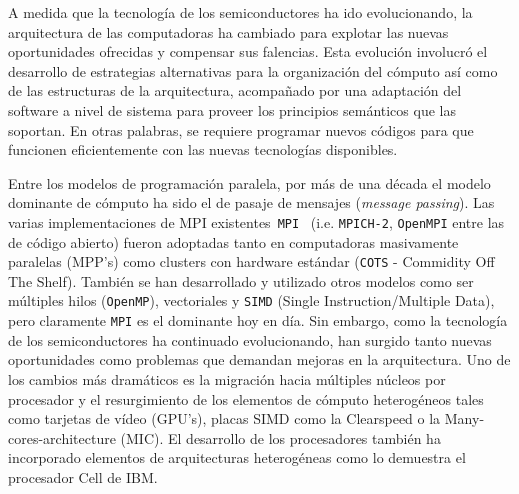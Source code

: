 \documentclass[a4paper,10pt]{article}
\begin{document}
A medida que la tecnolog\'ia de los semiconductores ha ido evolucionando, la arquitectura de las computadoras ha cambiado para explotar las nuevas oportunidades ofrecidas y compensar sus falencias. 
Esta evoluci\'on involucr\'o el desarrollo de estrategias alternativas para la organizaci\'on del c\'omputo as\'i como de las estructuras de la arquitectura, acompa\~nado por una adaptaci\'on del software a nivel de sistema para proveer los principios sem\'anticos que las soportan. 
En otras palabras, se requiere programar nuevos c\'odigos para que funcionen eficientemente con las nuevas tecnolog\'ias disponibles.

Entre los modelos de programaci\'on paralela, por m\'as de una d\'ecada el modelo dominante de c\'omputo ha sido el de pasaje de mensajes (\emph{message passing}). 
Las varias implementaciones de MPI existentes~\texttt{MPI}~\cite{Gropp1999a,Gropp1999b,Pachecho2011} (i.e. \texttt{MPICH-2}, \texttt{OpenMPI} entre las de c\'odigo abierto) fueron adoptadas tanto en computadoras masivamente paralelas (MPP's) como clusters con hardware est\'andar (\texttt{COTS} - Commidity Off The Shelf). 
Tambi\'en se han desarrollado y utilizado otros modelos como ser m\'ultiples hilos (\texttt{OpenMP}), vectoriales y \texttt{SIMD} (Single Instruction/Multiple Data), pero claramente \texttt{MPI} es el dominante hoy en d\'ia.
Sin embargo, como la tecnolog\'ia de los semiconductores ha continuado evolucionando, han surgido tanto nuevas oportunidades como problemas que demandan mejoras en la arquitectura.
Uno de los cambios m\'as dram\'aticos es la migraci\'on hacia m\'ultiples n\'ucleos por procesador y el resurgimiento de los elementos de c\'omputo heterog\'eneos tales como tarjetas de v\'ideo (GPU's), placas SIMD como la Clearspeed o la Many-cores-architecture (MIC). 
El desarrollo de los procesadores tambi\'en ha incorporado elementos de arquitecturas heterog\'eneas como lo demuestra el procesador Cell de IBM.
\end{document}
